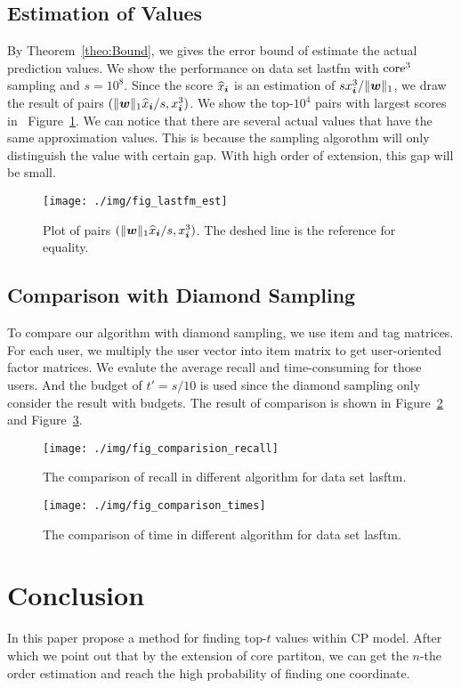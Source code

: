 \documentclass[letterpaper]{article}
\newcommand{\V}[1]{{\boldsymbol{{\MakeLowercase{#1}}}}}
\newcommand{\norm}[2]{\|#1\|_{#2}}
\newcommand{\Fig}[1]   {Figure~\ref{fig:#1}}
\newcommand{\Theo}[1] {Theorem~\ref{theo:#1}}
\begin{document}
\subsection{Estimation of Values}
By \Theo{Bound}, we gives the error bound of estimate the actual prediction values.
We show the performance on data set lastfm with ${\rm core}^3$ sampling and $s=10^8$.
Since the score $\widehat{x}_{\V{i}}$ is an estimation of $sx^3_{\V{i}}/\norm{\V{w}}{1}$,
we draw the result of pairs $(\norm{\V{w}}{1}\widehat{x}_{\V{i}}/s,x^3_{\V{i}})$.
We show the top-$10^4$ pairs with largest scores in ~\Fig{Est}.
We can notice that there are several actual values that have the same approximation values.
This is because the sampling algorothm will only distinguish the value with certain gap.
With high order of extension, this gap will be small. 
\begin{figure}[ht]
  \centering
  \texttt{[image: ./img/fig\_lastfm\_est]}\\
  \caption{Plot of pairs $(\norm{\V{w}}{1}\widehat{x}_{\V{i}}/s,x^3_{\V{i}})$.
          The deshed line is the reference for equality.}
  \label{fig:Est}
\end{figure}
\subsection{Comparison with Diamond Sampling}
To compare our algorithm with diamond sampling, we use item and tag matrices.
For each user, we multiply the user vector into item matrix
to get user-oriented factor matrices.
We evalute the average recall and time-consuming for those users.
And the budget of $t'=s/10$ is used since the diamond sampling only consider the result with budgets.
The result of comparison is shown in \Fig{Comparison_recall} and \Fig{Comparison_time}.

\begin{figure}[ht]
  \centering
  \texttt{[image: ./img/fig\_comparision\_recall]}\\
  \caption{The comparison of recall in different algorithm for data set lasftm.}
  \label{fig:Comparison_recall}
\end{figure}

\begin{figure}[ht]
    \centering
    \texttt{[image: ./img/fig\_comparison\_times]}\\
    \caption{The comparison of time in different algorithm for data set lasftm.}
\label{fig:Comparison_time}
\end{figure}

\section{Conclusion}
In this paper propose a method for finding top-$t$ values within CP model.
After which we point out that by the extension of core partiton, 
we can get the $n$-the order estimation and reach the high probability of finding one coordinate.


\end{document}
